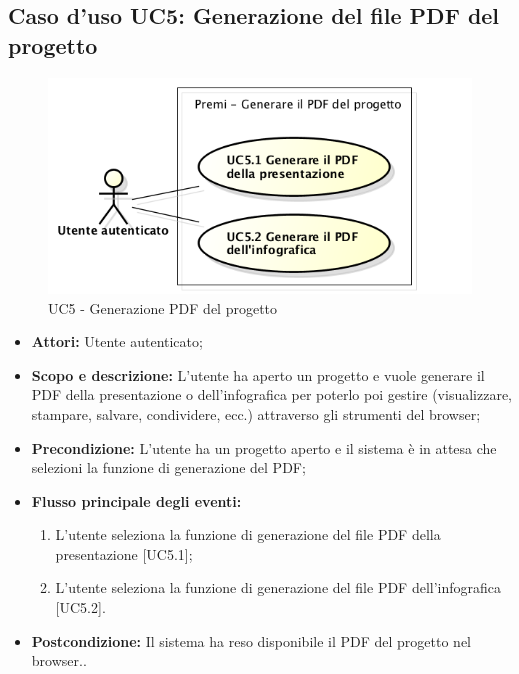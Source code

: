 \subsection{Caso d'uso UC5: Generazione del file PDF del progetto}
\begin{figure}[h] 
	\centering 
	\includegraphics[scale=0.45] {img/UC5.png}
	\caption{UC5 - Generazione PDF del progetto} 
\end{figure}

\begin{itemize}
	\item \textbf{Attori:} Utente autenticato;
	\item \textbf{Scopo e descrizione:} L'utente ha aperto un progetto e vuole generare il PDF della presentazione o dell'\gls{infografica} per poterlo poi gestire (visualizzare, stampare, salvare, condividere, ecc.) attraverso gli strumenti del browser;
	\item \textbf{Precondizione:} L'utente ha un progetto aperto e il sistema è in attesa che selezioni la funzione di generazione del PDF;
	\item \textbf{Flusso principale degli eventi:}
	\begin{enumerate}
		\item L'utente seleziona la funzione di generazione del file PDF della presentazione [UC5.1];
		\item L'utente seleziona la funzione di generazione del file PDF dell'\gls{infografica} [UC5.2].
	\end{enumerate}
	\item \textbf{Postcondizione:} Il sistema ha reso disponibile il PDF del progetto nel browser..
\end{itemize}

